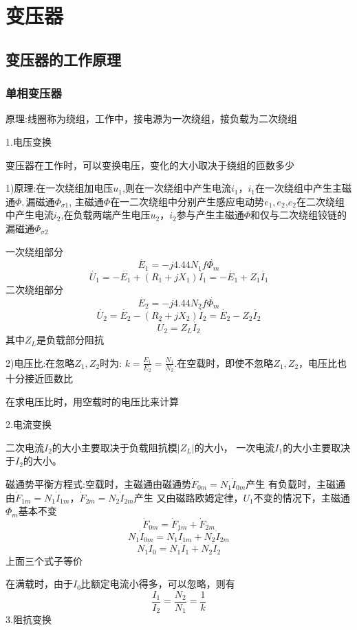 \documentclass[11pt,twoside,a4paper]{ctexart}
\begin{document}
\section{变压器}
\subsection{变压器的工作原理}
\subsubsection{单相变压器}
原理:线圈称为绕组，工作中，接电源为一次绕组，接负载为二次绕组

1.电压变换 

变压器在工作时，可以变换电压，变化的大小取决于绕组的匝数多少

1)原理:在一次绕组加电压$u_1 $,则在一次绕组中产生电流$i_1 $，$i_1 $在一次绕组中产生主磁通$\varPhi ,\text{漏磁通}\varPhi _{\sigma 1} $,
主磁通$\varPhi $在一二次绕组中分别产生感应电动势$e_1,e_2 $,$e_2 $在二次绕组中产生电流$i_2 $,在负载两端产生电压$u_2 $，$i_2 $参与产生主磁通$\varPhi $和仅与二次绕组铰链的
漏磁通$\varPhi _{\sigma 2} $

一次绕组部分
\[\dot{E_1} = -j4.44N_1f\dot{\varPhi _m} \]
\[\dot{U_1} = -\dot{E_1}+(R_1 + jX_1)\dot{I_1} = -\dot{E_1} + Z_1\dot{I_1} \]
二次绕组部分
\[\dot{E_2} = -j4.44N_2f\dot{\varPhi _m} \]
\[\dot{U_2} = \dot{E_2}-(R_2 + jX_2)\dot{I_2} = \dot{E_2} - Z_2\dot{I_2} \]  
\[\dot{U_2} = Z_L\dot{I_2}  \]
其中$Z_L $是负载部分阻抗

2)电压比:在忽略$Z_1,Z_2 $时为: $k = \frac{E_1}{E_2} = \frac{N_1}{N_2} $.在空载时，即使不忽略$Z_1,Z_2 $，电压比也十分接近匝数比

在求电压比时，用空载时的电压比来计算

2.电流变换

二次电流$I_2 $的大小主要取决于负载阻抗模$|Z_L| $的大小，
一次电流$I_1 $的大小主要取决于$I_2 $的大小。

磁通势平衡方程式:空载时，主磁通由磁通势$\dot{F}_{0m} = N_1\dot{I}_{0m} $产生
有负载时，主磁通由$\dot{F}_{1m} = N_1\dot{I}_{1m}，\dot{F}_{2m}  = N_2\dot{I}_{2m} $产生
又由磁路欧姆定律，$U_1 $不变的情况下，主磁通$\varPhi _m $基本不变
\[\dot{F}_{0m} = \dot{F}_{1m} + \dot{F}_{2m} \]
\[N_1\dot{I}_{0m} = N_1\dot{I}_{1m} + N_2\dot{I}_{2m} \]
\[N_1\dot{I}_{0} = N_1\dot{I}_{1} + N_2\dot{I}_{2} \]
上面三个式子等价

在满载时，由于$I_0 $比额定电流小得多，可以忽略，则有
\[\frac{I_1}{I_2} = \frac{N_2}{N_1} = \frac{1}{k} \]
3.阻抗变换
\end{document}
